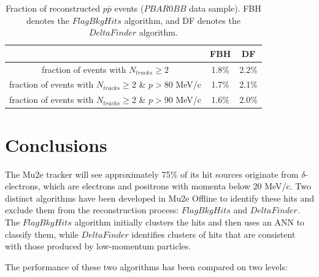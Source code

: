 \begin{center}
        \begin{table}[h!]
        \centering
        \renewcommand{\arraystretch}{1.}
        \begin{tabular}{| c | c | c |} 
            \hline
            &  FBH & DF\\
            \hline
            fraction of events with $N_{tracks} \geq 2$ &  1.8\% & 2.2\%\\
            \hline
            fraction of events with $N_{tracks} \geq 2$ \& $p>$80 MeV/c & 1.7\% & 2.1\%\\
            \hline
            fraction of events with $N_{tracks} \geq 2$ \& $p>$90 MeV/c & 1.6\% & 2.0\%\\
            \hline
            \end{tabular}
        \caption[Fraction of reconstructed $p\bar{p}$ events.]{Fraction of reconstructed $p\bar{p}$ events 
        ($PBAR0BB$ data sample). FBH denotes the $FlagBkgHits$ algorithm, 
        and DF denotes the $DeltaFinder$ algorithm.}
        \end{table}\label{tab:recoeffpbar}
\end{center}

\section{Conclusions}
The Mu2e tracker will see approximately 75\% of its hit 
sources originate from $\delta$-electrons, which are electrons 
and positrons with momenta below 20 MeV/c. Two distinct algorithms 
have been developed in Mu2e Offline to identify these hits and exclude 
them from the reconstruction process: $FlagBkgHits$ and $DeltaFinder$. 
The $FlagBkgHits$ algorithm initially clusters the hits and then uses an ANN 
to classify them, while $DeltaFinder$ identifies clusters of hits that are 
consistent with those produced by low-momentum particles.

The performance of these two algorithms has been compared on two levels:

